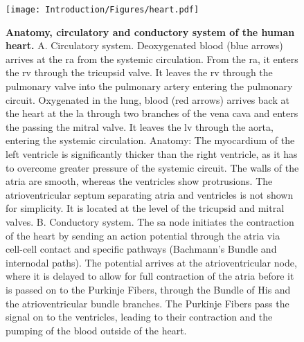 \begin{figure}[htbp]
	\centering
	\texttt{[image: Introduction/Figures/heart.pdf]}
	\caption[\textbf{Anatomy, circulatory and conductory system of the human heart. }]{\textbf{Anatomy, circulatory and conductory system of the human heart. }A. Circulatory system. Deoxygenated blood (blue arrows) arrives at the \gls{ra} from the systemic circulation. From the \gls{ra}, it enters the \gls{rv} through the tricupsid valve. It leaves the \gls{rv} through the pulmonary valve into the pulmonary artery entering the pulmonary circuit. Oxygenated in the lung, blood (red arrows) arrives back at the heart at the \gls{la} through two branches of the vena cava and enters the  passing the mitral valve. It leaves the \gls{lv} through the aorta, entering the systemic circulation. Anatomy: The myocardium of the left ventricle is significantly thicker than the right ventricle, as it has to overcome greater pressure of the systemic circuit. The walls of the atria are smooth, whereas the ventricles show protrusions. The atrioventricular septum separating atria and ventricles is not shown for simplicity. It is located at the level of the tricupsid and mitral valves. B. Conductory system. The \gls{sa} node initiates the contraction of the heart by sending an action potential through the atria via cell-cell contact and specific pathways (Bachmann's Bundle and internodal paths). The potential arrives at the atrioventricular node, where it is delayed to allow for full contraction of the atria before it is passed on to the Purkinje Fibers, through the Bundle of His and the atrioventricular bundle branches. The Purkinje Fibers pass the signal on to the ventricles, leading to their contraction and the pumping of the blood outside of the heart. } 
	 	\label{fig:heart}
\end{figure}
%

